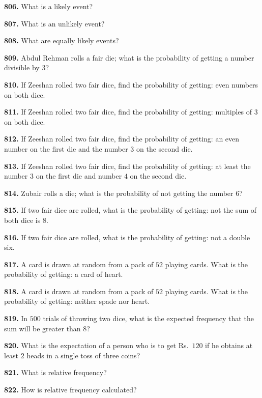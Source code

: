 \documentclass[11pt]{article}
\begin{document}
\bigskip
\noindent\textbf{806.} What is a likely event?

\bigskip
\noindent\textbf{807.} What is an unlikely event?

\bigskip
\noindent\textbf{808.} What are equally likely events?

\bigskip
\noindent\textbf{809.} Abdul Rehman rolls a fair die; what is the probability of getting a number divisible by $3$?

\bigskip
\noindent\textbf{810.} If Zeeshan rolled two fair dice, find the probability of getting: even numbers on both dice.

\bigskip
\noindent\textbf{811.} If Zeeshan rolled two fair dice, find the probability of getting: multiples of $3$ on both dice.

\bigskip
\noindent\textbf{812.} If Zeeshan rolled two fair dice, find the probability of getting: an even number on the first die and the number $3$ on the second die.

\bigskip
\noindent\textbf{813.} If Zeeshan rolled two fair dice, find the probability of getting: at least the number $3$ on the first die and number $4$ on the second die.

\bigskip
\noindent\textbf{814.} Zubair rolls a die; what is the probability of not getting the number $6$?

\bigskip
\noindent\textbf{815.} If two fair dice are rolled, what is the probability of getting: not the sum of both dice is $8$.

\bigskip
\noindent\textbf{816.} If two fair dice are rolled, what is the probability of getting: not a double six.

\bigskip
\noindent\textbf{817.} A card is drawn at random from a pack of $52$ playing cards. What is the probability of getting: a card of heart.

\bigskip
\noindent\textbf{818.} A card is drawn at random from a pack of $52$ playing cards. What is the probability of getting: neither spade nor heart.

\bigskip
\noindent\textbf{819.} In $500$ trials of throwing two dice, what is the expected frequency that the sum will be greater than $8$?

\bigskip
\noindent\textbf{820.} What is the expectation of a person who is to get Rs.\ $120$ if he obtains at least $2$ heads in a single toss of three coins?

\bigskip
\noindent\textbf{821.} What is relative frequency?

\bigskip
\noindent\textbf{822.} How is relative frequency calculated?
\end{document}
